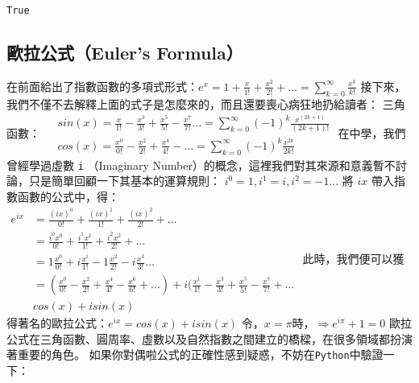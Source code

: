 \documentclass[11pt]{article}
\begin{document}
    \begin{Verbatim}[commandchars=\\\{\}]
True

    \end{Verbatim}

    \hypertarget{ux6b50ux62c9ux516cux5f0feulers-formula}{%
\subsection{歐拉公式（Euler's
Formula）}\label{ux6b50ux62c9ux516cux5f0feulers-formula}}

在前面給出了指數函數的多項式形式：\(e^x = 1 + \frac{x}{1!} + \frac{x^2}{2!} + \dots = \sum_{k = 0}^{\infty}\frac{x^k}{k!}\)
接下來，我們不僅不去解釋上面的式子是怎麼來的，而且還要喪心病狂地扔給讀者：
三角函數：
\(\begin{align*} &sin(x) = \frac{x}{1!}-\frac{x^3}{3!}+\frac{x^5}{5!}-\frac{x^7}{7!}\dots = \sum_{k=0}^{\infty}(-1)^k\frac{x^{(2k+1)}}{(2k+1)!} \\ &cos(x) = \frac{x^0}{0!}-\frac{x^2}{2!}+\frac{x^4}{4!}-\dots =\sum_{k=0}^{\infty}(-1)^k\frac{x^{2k}}{2k!}\end{align*}\)
在中學，我們曾經學過虛數 \texttt{i} （Imaginary
Number）的概念，這裡我們對其來源和意義暫不討論，只是簡單回顧一下其基本的運算規則：
\(i^0 = 1, i^1 = i, i^2 = -1 \dots\) 將 \(ix\)
帶入指數函數的公式中，得：
\(\begin{align*}e^{ix} &= \frac{(ix)^0}{0!} + \frac{(ix)^1}{1!} + \frac{(ix)^2}{2!} + \dots \\ &= \frac{i^0 x^0}{0!} + \frac{i^1 x^1}{1!} + \frac{i^2 x^2}{2!} + \dots \\ &= 1\frac{x^0}{0!} + i\frac{x^i}{1!} -1\frac{x^2}{2!} -i\frac{x^3}{3!} \dots \\ &=(\frac{x^0}{0!}-\frac{x^2}{2!} + \frac{x^4}{4!} - \frac{x^6}{6!} + \dots ) + i(\frac{x^1}{1!} -\frac{x^3}{3!} + \frac{x^5}{5!}-\frac{x^7}{7!} + \dots \\&cos(x) + isin(x)\end{align*}\)
此時，我們便可以獲得著名的歐拉公式：\(e^{ix} = cos(x) + isin(x)\)
令，\(x = \pi\)時，\(\Rightarrow e^{i\pi} + 1 = 0\)
歐拉公式在三角函數、圓周率、虛數以及自然指數之間建立的橋樑，在很多領域都扮演著重要的角色。
如果你對偶啦公式的正確性感到疑惑，不妨在\texttt{Python}中驗證一下：
\end{document}
